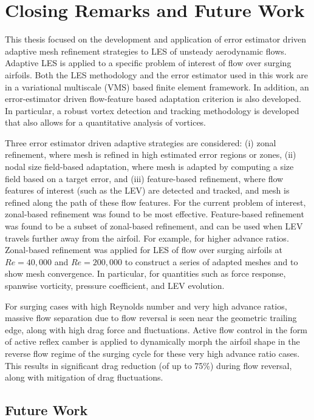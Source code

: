 \chapter{Closing Remarks and Future Work}

This thesis focused on the development and application of error estimator driven adaptive mesh refinement strategies to LES of unsteady aerodynamic flows.
Adaptive LES is applied to a specific problem of interest of flow over surging airfoils.
Both the LES methodology and the error estimator used in this work are in a variational multiscale (VMS) based finite element framework.
In addition, an error-estimator driven flow-feature based adaptation criterion is also developed. In particular, a robust vortex detection and tracking methodology is developed that also allows for a quantitative analysis of vortices.

Three error estimator driven adaptive strategies are considered: (i) zonal refinement, where mesh is refined in high estimated error regions or zones, (ii) nodal size field-based adaptation, where mesh is adapted by computing a size field based on a target error, and (iii) feature-based refinement, where flow features of interest (such as the LEV) are detected and tracked, and mesh is refined along the path of these flow features.
For the current problem of interest, zonal-based refinement was found to be most effective.
Feature-based refinement was found to be a subset of zonal-based refinement, and can be used when LEV travels further away from the airfoil. 
For example, for higher advance ratios.
Zonal-based refinement was applied for LES of flow over surging airfoils at $Re=40,000$ and $Re=200,000$ to construct a series of adapted meshes and to show mesh convergence. In particular, for quantities such as force response, spanwise vorticity, pressure coefficient, and LEV evolution.

For surging cases with high Reynolds number and very high advance ratios, massive flow separation due to flow reversal is seen near the geometric trailing edge, along with high drag force and fluctuations. 
Active flow control in the form of active reflex camber is applied to dynamically morph the airfoil shape in the reverse flow regime of the surging cycle for these very high advance ratio cases.
This results in significant drag reduction (of up to 75\%) during flow reversal, along with mitigation of drag fluctuations.

\section{Future Work}

